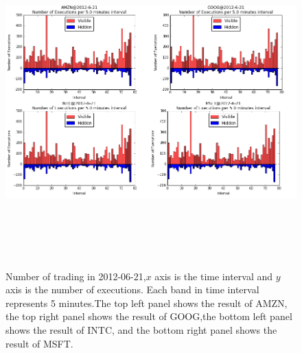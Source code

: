 \begin{figure}[hbtp]
  \begin{center}
    \includegraphics[width=6in,height=5in]{figures/execution.png}
  \end{center}
\caption{Number of trading in 2012-06-21,$x$ axis is the time interval and $y$ axis is the number of executions. Each band in time interval represents 5 minutes.The top left panel shows the result of AMZN, the top right panel shows the result of GOOG,the bottom left panel shows the result of INTC, and the bottom right panel shows the result of MSFT.   } \label{fig:execution}
\end{figure}

